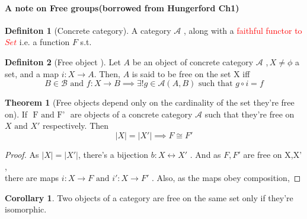 \documentclass{article}
\theoremstyle{definition}
\theoremstyle{definition}
\newtheorem{definition}{Definiton}[section]
\newtheorem{theorem}{Theorem}[section]
\newtheorem{corollary}{Corollary}[theorem]
\begin{document}
\paragraph{A note on Free groups(borrowed from Hungerford Ch1)}
\begin{definition}[Concrete category] %
	A category $ \mathcal{A}  $ , along with a \textcolor{red}{ faithful functor to $ Set $ } i.e. a function $ F $ s.t.
\end{definition}

\begin{definition}[Free object ] %
Let $ A $ be an object of concrete category $ \mathcal{A}  $ ,$ \, X \neq \phi $ a set, and a map $ i:X \rightarrow A $. Then, $ A $ is said to be free on the set X iff
\[ B \in \mathcal{B} \text{ and }  f:X \rightarrow B \implies \exists! g \in \mathcal{A} (A,B) \text{ such that } g \circ i = f  \]
\end{definition}

\begin{theorem}[Free objects depend only on the cardinality of the set they're free on] %
	If $ \text{ F and F' }$ are objects of a concrete category $ \mathcal{A} $ such that they're free on $ X \text{ and } X' $ respectively. Then
	\[ |X|=|X'| \implies F \cong F'\]
\end{theorem}
\begin{proof}
As $ |X|=|X'| $, there's a bijection $ b: X\longleftrightarrow X' $ . And as $ F,F' $ are free on X,X' , \\
there are maps $ i:X \rightarrow F \text{ and } i':X \rightarrow F' $ . Also, as the maps obey composition,
\end{proof}
\begin{corollary}
	Two objects of a category are free on the same set only if they're isomorphic.
\end{corollary}
\end{document}
